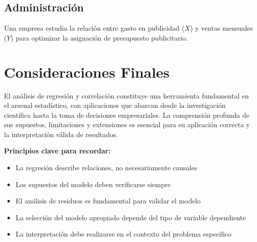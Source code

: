 \subsection{Administración}
\begin{example}
Una empresa estudia la relación entre gasto en publicidad ($X$) y ventas mensuales ($Y$) para optimizar la asignación de presupuesto publicitario.
\end{example}

\section{Consideraciones Finales}

El análisis de regresión y correlación constituye una herramienta fundamental en el arsenal estadístico, con aplicaciones que abarcan desde la investigación científica hasta la toma de decisiones empresariales. La comprensión profunda de sus supuestos, limitaciones y extensiones es esencial para su aplicación correcta y la interpretación válida de resultados.

\begin{remark}
\textbf{Principios clave para recordar:}
\begin{itemize}
\item La regresión describe relaciones, no necesariamente causales
\item Los supuestos del modelo deben verificarse siempre
\item El análisis de residuos es fundamental para validar el modelo
\item La selección del modelo apropiado depende del tipo de variable dependiente
\item La interpretación debe realizarse en el contexto del problema específico
\end{itemize}
\end{remark}

